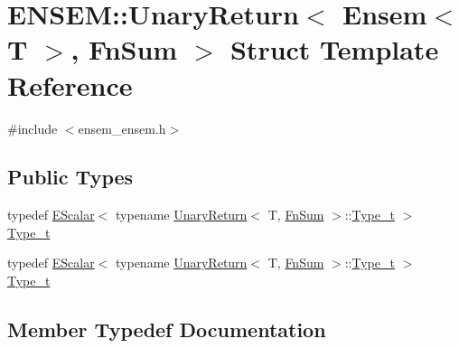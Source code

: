 \hypertarget{structENSEM_1_1UnaryReturn_3_01Ensem_3_01T_01_4_00_01FnSum_01_4}{}\section{E\+N\+S\+EM\+:\+:Unary\+Return$<$ Ensem$<$ T $>$, Fn\+Sum $>$ Struct Template Reference}
\label{structENSEM_1_1UnaryReturn_3_01Ensem_3_01T_01_4_00_01FnSum_01_4}


{\ttfamily \#include $<$ensem\+\_\+ensem.\+h$>$}

\subsection*{Public Types}
\begin{DoxyCompactItemize}
\item 
typedef \mbox{\hyperlink{classENSEM_1_1EScalar}{E\+Scalar}}$<$ typename \mbox{\hyperlink{structENSEM_1_1UnaryReturn}{Unary\+Return}}$<$ T, \mbox{\hyperlink{structENSEM_1_1FnSum}{Fn\+Sum}} $>$\+::\mbox{\hyperlink{structENSEM_1_1UnaryReturn_3_01Ensem_3_01T_01_4_00_01FnSum_01_4_ad99eb2820cca4a76378ee89c9abbf4e3}{Type\+\_\+t}} $>$ \mbox{\hyperlink{structENSEM_1_1UnaryReturn_3_01Ensem_3_01T_01_4_00_01FnSum_01_4_ad99eb2820cca4a76378ee89c9abbf4e3}{Type\+\_\+t}}
\item 
typedef \mbox{\hyperlink{classENSEM_1_1EScalar}{E\+Scalar}}$<$ typename \mbox{\hyperlink{structENSEM_1_1UnaryReturn}{Unary\+Return}}$<$ T, \mbox{\hyperlink{structENSEM_1_1FnSum}{Fn\+Sum}} $>$\+::\mbox{\hyperlink{structENSEM_1_1UnaryReturn_3_01Ensem_3_01T_01_4_00_01FnSum_01_4_ad99eb2820cca4a76378ee89c9abbf4e3}{Type\+\_\+t}} $>$ \mbox{\hyperlink{structENSEM_1_1UnaryReturn_3_01Ensem_3_01T_01_4_00_01FnSum_01_4_ad99eb2820cca4a76378ee89c9abbf4e3}{Type\+\_\+t}}
\end{DoxyCompactItemize}


\subsection{Member Typedef Documentation}
\mbox{\label{structENSEM_1_1UnaryReturn_3_01Ensem_3_01T_01_4_00_01FnSum_01_4_ad99eb2820cca4a76378ee89c9abbf4e3}} 
